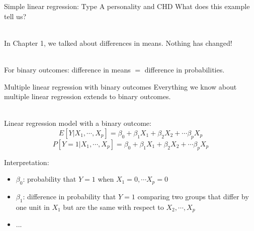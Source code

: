 \documentclass{beamer}
\begin{document}
\begin{frame}{Simple linear regression: Type A personality and CHD}
	What does this example tell us? 
	\\ ~\
	
	In Chapter 1, we talked about differences in means. Nothing has changed!
	\\ ~\

	For binary outcomes: difference in means $=$ difference in probabilities.
\end{frame}

\begin{frame}{Multiple linear regression with binary outcomes}
	Everything we know about multiple linear regression extends to binary outcomes. 
	\\ ~\
	
	Linear regression model with a binary outcome: $$E[Y|X_1,\cdots,X_p] = \beta_0 + \beta_1 X_1 + \beta_2X_2 + \cdots \beta_p X_p$$ $$P[Y=1|X_1,\cdots,X_p] = \beta_0 + \beta_1 X_1 + \beta_2 X_2 + \cdots \beta_p X_p$$
	
	\color{blue} Interpretation: \color{black}
	\begin{itemize} 
		\item $\beta_0$: \pause probability that $Y=1$ when $X_1 = 0, \cdots X_p = 0$
		\item $\beta_1$: \pause difference in probability that $Y=1$ comparing two groups that differ by one unit in $X_1$ but are the same with respect to $X_2,\cdots,X_p$ 
		\item ...
	\end{itemize}
\end{frame}
\end{document}
